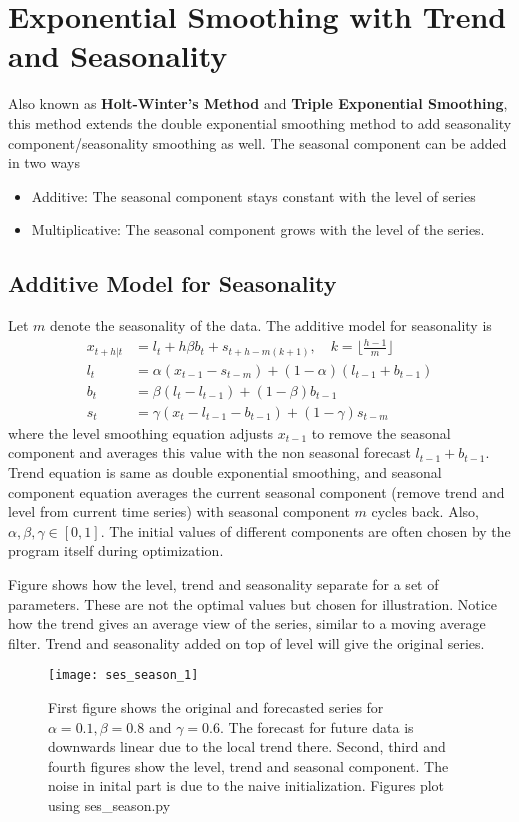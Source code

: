 \documentclass[../../time_series_notes.tex]{subfiles}
\begin{document}
\section{Exponential Smoothing with Trend and Seasonality}
Also known as \textbf{Holt-Winter's Method} and \textbf{Triple Exponential Smoothing}, this method extends the double exponential smoothing method to add seasonality component/seasonality smoothing as well. The seasonal component can be added in two ways
\begin{itemize}
    \item Additive: The seasonal component stays constant with the level of series
    \item Multiplicative: The seasonal component grows with the level of the series.
\end{itemize}

\subsection{Additive Model for Seasonality}
Let $m$ denote the seasonality of the data. The additive model for seasonality is
\begin{align*}
    x_{t+h|t} &= l_{t} + h\beta b_{t} + s_{t+h - m(k+1)}, \quad k = \lfloor \frac{h-1}{m} \rfloor\\
    l_{t} &= \alpha(x_{t-1} - s_{t-m}) + (1-\alpha)(l_{t-1} + b_{t-1})\\
    b_{t} &= \beta (l_{t} - l_{t-1}) + (1-\beta)b_{t-1}\\
    s_{t} &= \gamma(x_{t} - l_{t-1}-b_{t-1}) + (1-\gamma)s_{t-m}
\end{align*}
where the level smoothing equation adjusts $x_{t-1}$ to remove the seasonal component and averages this value with the non seasonal forecast $l_{t-1} + b_{t-1}$. Trend equation is same as double exponential smoothing, and seasonal component equation averages the current seasonal component (remove trend and level from current time series) with seasonal component $m$ cycles back. Also, $\alpha, \beta, \gamma \in [0,1]$. The initial values of different components are often chosen by the program itself during optimization.\newline

Figure shows how the level, trend and seasonality separate for a set of parameters. These are not the optimal values but chosen for illustration. Notice how the trend gives an average view of the series, similar to a moving average filter. Trend and seasonality added on top of level will give the original series.
\begin{figure}[h]
    \texttt{[image: ses\_season\_1]}
    \centering
    \caption {First figure shows the original and forecasted series for $\alpha=0.1, \beta=0.8$ and $\gamma=0.6$. The forecast for future data is downwards linear due to the local trend there. Second, third and fourth figures show the level, trend and seasonal component. The noise in inital part is due to the naive initialization. Figures plot using ses\_season.py}
    \label{fig:ses_season_1} %
\end{figure}
\end{document}

